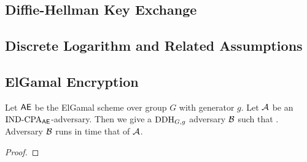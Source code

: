 \subsection{Diffie-Hellman Key Exchange}

\subsection{Discrete Logarithm and Related Assumptions}

\subsection{ElGamal Encryption}


\begin{theorem}
	Let $\textsf{AE}$ be the ElGamal scheme over group $G$ with generator $g$. 
	Let ${\mathcal A}$ be an $\textnormal{IND-CPA}_{\textsf{AE}}$-adversary. Then we give a $\textnormal{DDH}_{G,g}$ 
	adversary ${\mathcal B}$ such that 
	\bnm
	\AdvINDCPA{\AEnc}{\advA} \cdotsm {} \;.
	\enm
	Adversary ${\mathcal B}$ runs in time that of ${\mathcal A}$. 
\end{theorem}

\begin{proof} 
	
\end{proof}